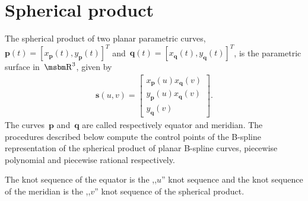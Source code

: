 \newpage
\section{Spherical product}

\begin{sloppypar}
The spherical product of two planar parametric curves,
$\bm{p}(t)=[x_{\bm{p}}(t),y_{\bm{p}}(t)]^T$
and~$\bm{q}(t)=[x_{\bm{q}}(t),y_{\bm{q}}(t)]^T$,
is the parametric surface in~$\R^3$, given by
\begin{align*}
  \bm{s}(u,v) = \left[\begin{array}{c}
    x_{\bm{p}}(u)x_{\bm{q}}(v) \\
    y_{\bm{p}}(u)x_{\bm{q}}(v) \\
    y_{\bm{q}}(v)
  \end{array}\right].
\end{align*}
The curves~$\bm{p}$ and~$\bm{q}$ are called respectively equator
and meridian. The procedures described below compute the
control points of the B-spline representation of the spherical product of
planar B-spline curves, piecewise polynomial and piecewise rational
respectively.%
\end{sloppypar}

The knot sequence of the equator is the ,,$u$'' knot sequence
and the knot sequence of the meridian is the ,,$v$'' knot
sequence of the spherical product.

\vspace{\bigskipamount}

\vspace{\bigskipamount}

